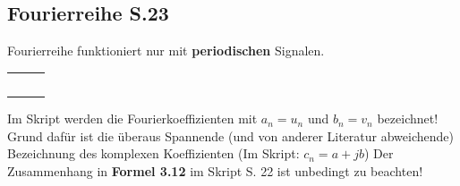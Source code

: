 \subsection{Fourierreihe S.23}

Fourierreihe funktioniert nur mit \textbf{periodischen} Signalen.

\begin{table}[H]
	\setcellgapes{6pt}
	\begin{tabularx}{\textwidth}{|Y|Y|Y|}
		\hline
		 &
		 &
		 \\
		\hline
		 &
		 &
		 \\
		\hline
		 &
		 &
		 \\
		\hline
		 &
		 &
		 \\
		\hline
		 &
		 &
		 \\
		\hline
		 &
		 &
		 \\
		\hline
	\end{tabularx}
\end{table}
Im Skript werden die Fourierkoeffizienten mit $a_n = u_n$ und $b_n = v_n$ bezeichnet! Grund dafür ist die überaus Spannende (und von anderer Literatur abweichende) Bezeichnung des komplexen Koeffizienten (Im Skript: $c_n = a + jb$) Der Zusammenhang in \textbf{Formel 3.12} im Skript S. 22 ist unbedingt zu beachten!


